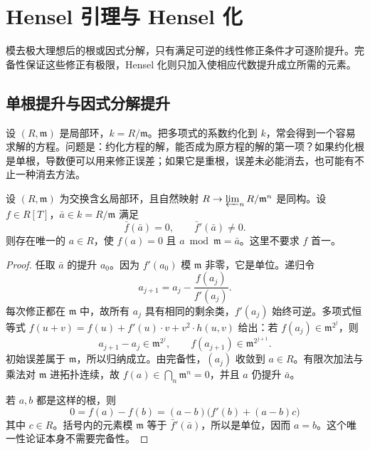 
\section{Hensel 引理与 Hensel 化}
\label{b3:sec:2301}

模去极大理想后的根或因式分解，只有满足可逆的线性修正条件才可逐阶提升。完备性保证这些修正有极限，Hensel 化则只加入使相应代数提升成立所需的元素。

%
%
%

\subsection{单根提升与因式分解提升}
\label{b3:subsec:2301:01}

设 \((R,\mathfrak m)\) 是局部环，\(k=R/\mathfrak m\)。把多项式的系数约化到 \(k\)，常会得到一个容易求解的方程。问题是：约化方程的解，能否成为原方程的解的第一项？如果约化根是单根，导数便可以用来修正误差；如果它是重根，误差未必能消去，也可能有不止一种消去方法。

\begin{theorem}\label{b3:thm:hensel-simple-root}
	设 \((R,\mathfrak m)\) 为交换含幺局部环，且自然映射 \(R\to\varprojlim_n R/\mathfrak m^n\) 是同构。设 \(f\in R[T]\)，\(\bar a\in k=R/\mathfrak m\) 满足
	\[
		\bar f(\bar a)=0,\qquad \bar f'(\bar a)\ne0.
	\]
	则存在唯一的 \(a\in R\)，使 \(f(a)=0\) 且 \(a\bmod\mathfrak m=\bar a\)。这里不要求 \(f\) 首一。
\end{theorem}
\begin{proof}
	任取 \(\bar a\) 的提升 \(a_0\)。因为 \(f'(a_0)\) 模 \(\mathfrak m\) 非零，它是单位。递归令
	\[
		a_{j+1}=a_j-\frac{f(a_j)}{f'(a_j)}.
	\]
	每次修正都在 \(\mathfrak m\) 中，故所有 \(a_j\) 具有相同的剩余类，\(f'(a_j)\) 始终可逆。多项式恒等式 \(f(u+v)=f(u)+f'(u)\cdot v+v^2\cdot h(u,v)\) 给出：若 \(f(a_j)\in\mathfrak m^{2^j}\)，则
	\[
		a_{j+1}-a_j\in\mathfrak m^{2^j},\qquad f(a_{j+1})\in\mathfrak m^{2^{j+1}}.
	\]
	初始误差属于 \(\mathfrak m\)，所以归纳成立。由完备性，\((a_j)\) 收敛到 \(a\in R\)。有限次加法与乘法对 \(\mathfrak m\) 进拓扑连续，故 \(f(a)\in\bigcap_n\mathfrak m^n=0\)，并且 \(a\) 仍提升 \(\bar a\)。

	若 \(a,b\) 都是这样的根，则
	\[
		0=f(a)-f(b)=(a-b)\bigl(f'(b)+(a-b)c\bigr)
	\]
	其中 \(c\in R\)。括号内的元素模 \(\mathfrak m\) 等于 \(\bar f'(\bar a)\)，所以是单位，因而 \(a=b\)。这个唯一性论证本身不需要完备性。
\end{proof}

